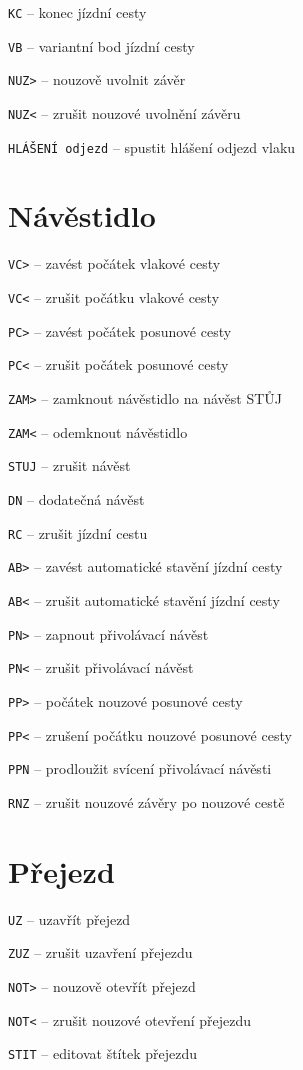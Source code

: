 \documentclass[12pt,a4paper,landscape]{article}
\begin{document}
\begin{multicols}{3}
\begin{compactitem}
	\item \texttt{KC} -- konec jízdní cesty
	\item \texttt{VB} -- variantní bod jízdní cesty
	
	\item \texttt{NUZ>} -- nouzově uvolnit závěr
	\item \texttt{NUZ<} -- zrušit nouzové uvolnění závěru
	
	\item \texttt{HLÁŠENÍ odjezd} -- spustit hlášení odjezd vlaku
\end{compactitem}	

\section{Návěstidlo}
\begin{compactitem}
	\item \texttt{VC>} -- zavést počátek vlakové cesty
	\item \texttt{VC<} -- zrušit počátku vlakové cesty
	\item \texttt{PC>} -- zavést počátek posunové cesty
	\item \texttt{PC<} -- zrušit počátek posunové cesty
	\item \texttt{ZAM>} -- zamknout návěstidlo na návěst STŮJ
	\item \texttt{ZAM<} -- odemknout návěstidlo
	\item \texttt{STUJ} -- zrušit návěst
	\item \texttt{DN} -- dodatečná návěst
	\item \texttt{RC} -- zrušit jízdní cestu
	\item \texttt{AB>} -- zavést automatické stavění jízdní cesty
	\item \texttt{AB<} -- zrušit automatické stavění jízdní cesty
	\item \texttt{PN>} -- zapnout přivolávací návěst
	\item \texttt{PN<} -- zrušit přivolávací návěst
	\item \texttt{PP>} -- počátek nouzové posunové cesty
	\item \texttt{PP<} -- zrušení počátku nouzové posunové cesty
	\item \texttt{PPN} -- prodloužit svícení přivolávací návěsti
	\item \texttt{RNZ} -- zrušit nouzové závěry po nouzové cestě
\end{compactitem}	

\section{Přejezd}
\begin{compactitem}
	\item \texttt{UZ} -- uzavřít přejezd
	\item \texttt{ZUZ} -- zrušit uzavření přejezdu
	\item \texttt{NOT>} -- nouzově otevřít přejezd
	\item \texttt{NOT<} -- zrušit nouzové otevření přejezdu
	\item \texttt{STIT} -- editovat štítek přejezdu	
\end{compactitem}


\end{multicols}
\end{document}
